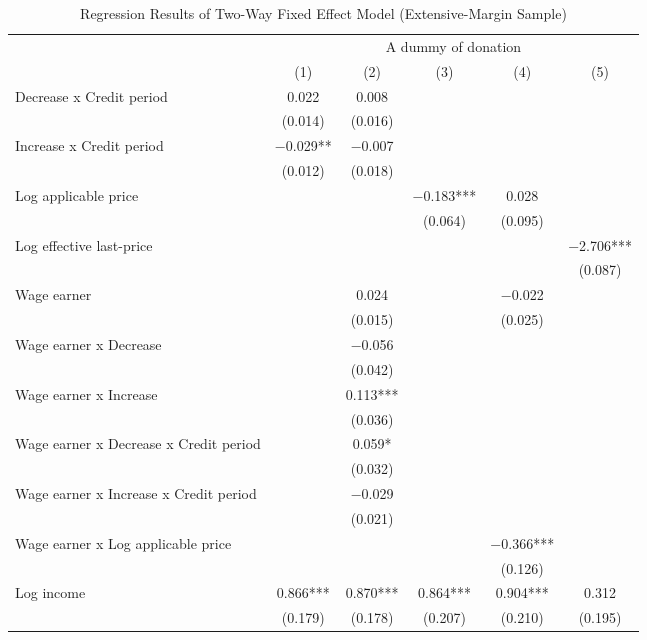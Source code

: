 \begin{table}

\caption{Regression Results of Two-Way Fixed Effect Model (Extensive-Margin Sample)\label{tab:fe-model-ext}}
\centering
\fontsize{8}{10}\selectfont
\begin{threeparttable}
\begin{tabular}[t]{lccccc}
\toprule
\multicolumn{1}{c}{ } & \multicolumn{5}{c}{A dummy of donation} \\
\cmidrule(l{3pt}r{3pt}){2-6}
  & (1) & (2) & (3) & (4) & (5)\\
\midrule
Decrease x Credit period & \num{0.022} & \num{0.008} &  &  & \\
 & (\num{0.014}) & (\num{0.016}) &  &  & \\
Increase x Credit period & \num{-0.029}** & \num{-0.007} &  &  & \\
 & (\num{0.012}) & (\num{0.018}) &  &  & \\
Log applicable price &  &  & \num{-0.183}*** & \num{0.028} & \\
 &  &  & (\num{0.064}) & (\num{0.095}) & \\
Log effective last-price &  &  &  &  & \num{-2.706}***\\
 &  &  &  &  & (\num{0.087})\\
Wage earner &  & \num{0.024} &  & \num{-0.022} & \\
 &  & (\num{0.015}) &  & (\num{0.025}) & \\
Wage earner x Decrease &  & \num{-0.056} &  &  & \\
 &  & (\num{0.042}) &  &  & \\
Wage earner x Increase &  & \num{0.113}*** &  &  & \\
 &  & (\num{0.036}) &  &  & \\
Wage earner x Decrease x Credit period &  & \num{0.059}* &  &  & \\
 &  & (\num{0.032}) &  &  & \\
Wage earner x Increase x Credit period &  & \num{-0.029} &  &  & \\
 &  & (\num{0.021}) &  &  & \\
Wage earner x Log applicable price &  &  &  & \num{-0.366}*** & \\
 &  &  &  & (\num{0.126}) & \\
Log income & \num{0.866}*** & \num{0.870}*** & \num{0.864}*** & \num{0.904}*** & \num{0.312}\\
 & (\num{0.179}) & (\num{0.178}) & (\num{0.207}) & (\num{0.210}) & (\num{0.195})\\

\end{tabular}
\end{threeparttable}
\end{table}
